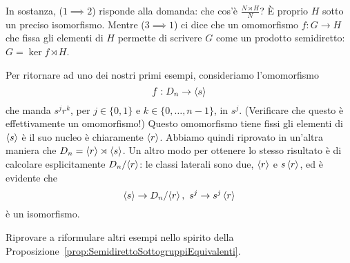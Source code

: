 In sostanza, ($1 \implies 2$) risponde alla domanda: che cos'è $\frac{N \rtimes H}{N}$? È proprio $H$ sotto un preciso isomorfismo. Mentre ($3 \implies 1$) ci dice che un omomorfismo $f : G \to H$ che fissa gli elementi di $H$ permette di scrivere $G$ come un prodotto semidiretto: $G = \ker f \rtimes H$.

\begin{esem}
Per ritornare ad uno dei nostri primi esempi, consideriamo l'omomorfismo
\[f : D_n \to \left\langle s\right\rangle\]
che manda $s^jr^k$, per $j \in \{0, 1\}$ e $k \in \{0, \dots{}, n-1\}$, in $s^j$. (Verificare che questo è effettivamente un omomorfismo!) Questo omomorfismo tiene fissi gli elementi di $\left\langle s\right\rangle$ è il suo nucleo è chiaramente $\left\langle r\right\rangle$. Abbiamo quindi riprovato in un'altra maniera che $D_n = \left\langle r\right\rangle \rtimes \left\langle s\right\rangle$.\newline
Un altro modo per ottenere lo stesso risultato è di calcolare esplicitamente ${D_n}{/}{\left\langle r\right\rangle}$: le classi laterali sono due, $\left\langle r\right\rangle$ e $s \left\langle r\right\rangle$, ed è evidente che
\[\left\langle s\right\rangle \to {D_n}{/}{\left\langle r\right\rangle}\,,\ s^j \to s^j \left\langle r\right\rangle\]
è un isomorfismo.
\end{esem}

\begin{eser}
Riprovare a riformulare altri esempi nello spirito della Proposizione~\ref{prop:SemidirettoSottogruppiEquivalenti}.
\end{eser}

